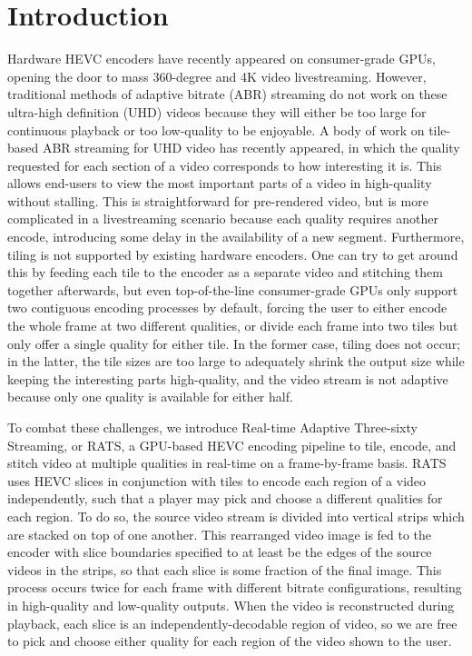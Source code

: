 
\section{Introduction}
Hardware HEVC encoders have recently appeared on consumer-grade GPUs, opening the door to mass 360-degree and 4K video livestreaming. However, traditional methods of adaptive bitrate (ABR) streaming do not work on these ultra-high definition (UHD) videos because they will either be too large for continuous playback or too low-quality to be enjoyable. A body of work on tile-based ABR streaming for UHD video has recently appeared, in which the quality requested for each section of a video corresponds to how interesting it is. This allows end-users to view the most important parts of a video in high-quality without stalling. This is straightforward for pre-rendered video, but is more complicated in a livestreaming scenario because each quality requires another encode, introducing some delay in the availability of a new segment. Furthermore, tiling is not supported by existing hardware encoders. One can try to get around this by feeding each tile to the encoder as a separate video and stitching them together afterwards, but even top-of-the-line consumer-grade GPUs only support two contiguous encoding processes by default, forcing the user to either encode the whole frame at two different qualities, or divide each frame into two tiles but only offer a single quality for either tile. In the former case, tiling does not occur; in the latter, the tile sizes are too large to adequately shrink the output size while keeping the interesting parts high-quality, and the video stream is not adaptive because only one quality is available for either half.

To combat these challenges, we introduce Real-time Adaptive Three-sixty Streaming, or RATS, a GPU-based HEVC encoding pipeline to tile, encode, and stitch video at multiple qualities in real-time on a frame-by-frame basis. RATS uses HEVC slices in conjunction with tiles to encode each region of a video independently, such that a player may pick and choose a different qualities for each region. To do so, the source video stream is divided into vertical strips which are stacked on top of one another. This rearranged video image is fed to the encoder with slice boundaries specified to at least be the edges of the source videos in the strips, so that each slice is some fraction of the final image. This process occurs twice for each frame with different bitrate configurations, resulting in high-quality and low-quality outputs. When the video is reconstructed during playback, each slice is an independently-decodable region of video, so we are free to pick and choose either quality for each region of the video shown to the user.

